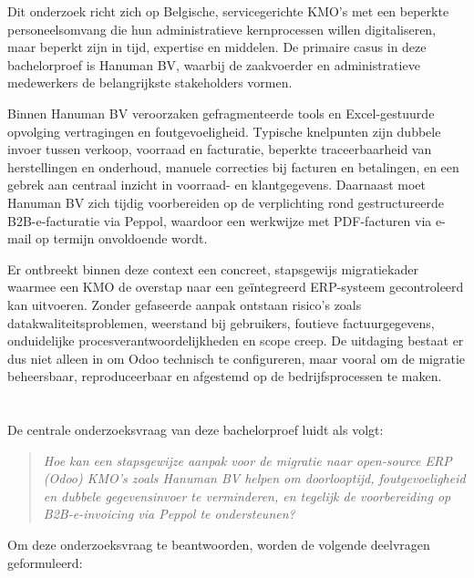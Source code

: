 Dit onderzoek richt zich op Belgische, servicegerichte KMO's met een beperkte personeelsomvang die hun administratieve kernprocessen willen digitaliseren, maar beperkt zijn in tijd, expertise en middelen. De primaire casus in deze bachelorproef is Hanuman BV, waarbij de zaakvoerder en administratieve medewerkers de belangrijkste stakeholders vormen.

Binnen Hanuman BV veroorzaken gefragmenteerde tools en Excel-gestuurde opvolging vertragingen en foutgevoeligheid. Typische knelpunten zijn dubbele invoer tussen verkoop, voorraad en facturatie, beperkte traceerbaarheid van herstellingen en onderhoud, manuele correcties bij facturen en betalingen, en een gebrek aan centraal inzicht in voorraad- en klantgegevens. Daarnaast moet Hanuman BV zich tijdig voorbereiden op de verplichting rond gestructureerde B2B-e-facturatie via Peppol, waardoor een werkwijze met PDF-facturen via e-mail op termijn onvoldoende wordt.

Er ontbreekt binnen deze context een concreet, stapsgewijs migratiekader waarmee een KMO de overstap naar een geïntegreerd ERP-systeem gecontroleerd kan uitvoeren. Zonder gefaseerde aanpak ontstaan risico's zoals datakwaliteitsproblemen, weerstand bij gebruikers, foutieve factuurgegevens, onduidelijke procesverantwoordelijkheden en scope creep. De uitdaging bestaat er dus niet alleen in om Odoo technisch te configureren, maar vooral om de migratie beheersbaar, reproduceerbaar en afgestemd op de bedrijfsprocessen te maken.

\section{}%
\label{sec:onderzoeksvraag}

De centrale onderzoeksvraag van deze bachelorproef luidt als volgt:

\begin{quote}
    \textit{Hoe kan een stapsgewijze aanpak voor de migratie naar open-source ERP (Odoo) KMO's zoals Hanuman BV helpen om doorlooptijd, foutgevoeligheid en dubbele gegevensinvoer te verminderen, en tegelijk de voorbereiding op B2B-e-invoicing via Peppol te ondersteunen?}
\end{quote}

Om deze onderzoeksvraag te beantwoorden, worden de volgende deelvragen geformuleerd:

